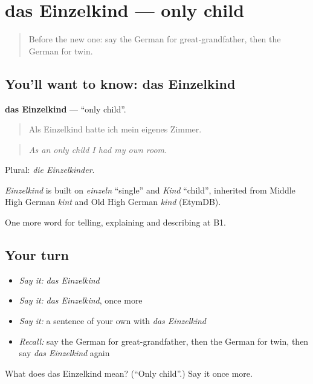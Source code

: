 \section[das Einzelkind]{das Einzelkind — only child}

\label{lesson:GE-C490-einzelkind}



\begin{quote}
Before the new one: say the German for great-grandfather, then the German for twin.
\end{quote}

\subsection*{You'll want to know: das Einzelkind}
\textbf{das Einzelkind} — \textquotedblleft{}only child\textquotedblright{}.

\begin{quote}
Als Einzelkind hatte ich mein eigenes Zimmer.
\end{quote}

\begin{quote}
\emph{As an only child I had my own room.}
\end{quote}

Plural: \emph{die Einzelkinder}.

\begin{cousinweb}
\emph{Einzelkind} is built on \emph{einzeln} \textquotedblleft{}single\textquotedblright{} and \emph{Kind} \textquotedblleft{}child\textquotedblright{}, inherited from Middle High German \emph{kint} and Old High German \emph{kind} (EtymDB).
\end{cousinweb}

\begin{grammarlens}[title={What you've built}]
One more word for telling, explaining and describing at B1.
\end{grammarlens}

\subsection*{Your turn}
\begin{itemize}
\raggedright
  \item \emph{Say it:} \emph{das Einzelkind}
  \item \emph{Say it:} \emph{das Einzelkind}, once more
  \item \emph{Say it:} a sentence of your own with \emph{das Einzelkind}
  \item \emph{Recall:} say the German for great-grandfather, then the German for twin, then say \emph{das Einzelkind} again
\end{itemize}

\begin{tcolorbox}[breakable,colback=teal!4,colframe=teal!35!black,title={Before you move on}]
What does das Einzelkind mean? (\textquotedblleft{}Only child\textquotedblright{}.) Say it once more.
\end{tcolorbox}
